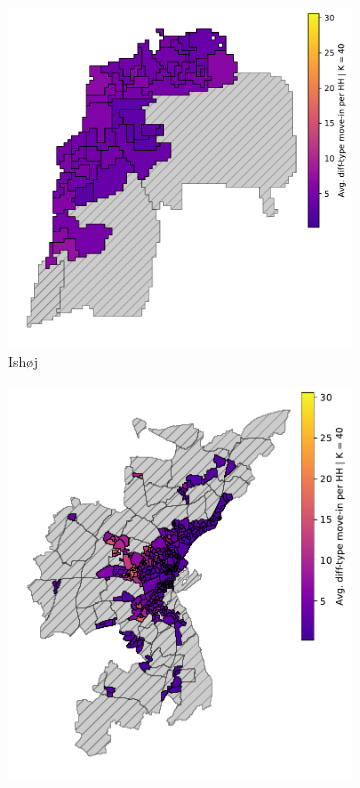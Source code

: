 \documentclass[main.tex]{subfiles}
\begin{document}
\begin{figure}
\centering
\caption{Incidence of new different-type neighbors at the neighborhood level} \label{fig:incidence_different_type_neighborhood}
	\begin{subfigure}{.5\textwidth}	
	\centering
	\includegraphics[width=\textwidth]{figs/ishoj_howdy_neighbor_sample.pdf}	
	\caption{Ishøj} \label{fig:incidence_different_type_ishoj}
	\end{subfigure}
    \begin{subfigure}{.42\textwidth}	
	\centering
	\includegraphics[width=\textwidth]{figs/aarhus_howdy_neighbor_sample.pdf}	

\end{subfigure}
\end{figure}
\end{document}
